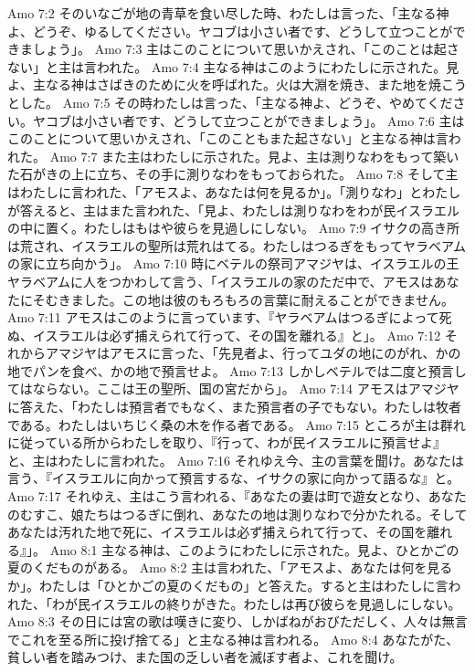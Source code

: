 Amo 7:2  そのいなごが地の青草を食い尽した時、わたしは言った、「主なる神よ、どうぞ、ゆるしてください。ヤコブは小さい者です、どうして立つことができましょう」。
Amo 7:3  主はこのことについて思いかえされ、「このことは起さない」と主は言われた。
Amo 7:4  主なる神はこのようにわたしに示された。見よ、主なる神はさばきのために火を呼ばれた。火は大淵を焼き、また地を焼こうとした。
Amo 7:5  その時わたしは言った、「主なる神よ、どうぞ、やめてください。ヤコブは小さい者です、どうして立つことができましょう」。
Amo 7:6  主はこのことについて思いかえされ、「このこともまた起さない」と主なる神は言われた。
Amo 7:7  また主はわたしに示された。見よ、主は測りなわをもって築いた石がきの上に立ち、その手に測りなわをもっておられた。
Amo 7:8  そして主はわたしに言われた、「アモスよ、あなたは何を見るか」。「測りなわ」とわたしが答えると、主はまた言われた、「見よ、わたしは測りなわをわが民イスラエルの中に置く。わたしはもはや彼らを見過しにしない。
Amo 7:9  イサクの高き所は荒され、イスラエルの聖所は荒れはてる。わたしはつるぎをもってヤラベアムの家に立ち向かう」。
Amo 7:10  時にベテルの祭司アマジヤは、イスラエルの王ヤラベアムに人をつかわして言う、「イスラエルの家のただ中で、アモスはあなたにそむきました。この地は彼のもろもろの言葉に耐えることができません。
Amo 7:11  アモスはこのように言っています、『ヤラベアムはつるぎによって死ぬ、イスラエルは必ず捕えられて行って、その国を離れる』と」。
Amo 7:12  それからアマジヤはアモスに言った、「先見者よ、行ってユダの地にのがれ、かの地でパンを食べ、かの地で預言せよ。
Amo 7:13  しかしベテルでは二度と預言してはならない。ここは王の聖所、国の宮だから」。
Amo 7:14  アモスはアマジヤに答えた、「わたしは預言者でもなく、また預言者の子でもない。わたしは牧者である。わたしはいちじく桑の木を作る者である。
Amo 7:15  ところが主は群れに従っている所からわたしを取り、『行って、わが民イスラエルに預言せよ』と、主はわたしに言われた。
Amo 7:16  それゆえ今、主の言葉を聞け。あなたは言う、『イスラエルに向かって預言するな、イサクの家に向かって語るな』と。
Amo 7:17  それゆえ、主はこう言われる、『あなたの妻は町で遊女となり、あなたのむすこ、娘たちはつるぎに倒れ、あなたの地は測りなわで分かたれる。そしてあなたは汚れた地で死に、イスラエルは必ず捕えられて行って、その国を離れる』」。
Amo 8:1  主なる神は、このようにわたしに示された。見よ、ひとかごの夏のくだものがある。
Amo 8:2  主は言われた、「アモスよ、あなたは何を見るか」。わたしは「ひとかごの夏のくだもの」と答えた。すると主はわたしに言われた、「わが民イスラエルの終りがきた。わたしは再び彼らを見過しにしない。
Amo 8:3  その日には宮の歌は嘆きに変り、しかばねがおびただしく、人々は無言でこれを至る所に投げ捨てる」と主なる神は言われる。
Amo 8:4  あなたがた、貧しい者を踏みつけ、また国の乏しい者を滅ぼす者よ、これを聞け。
